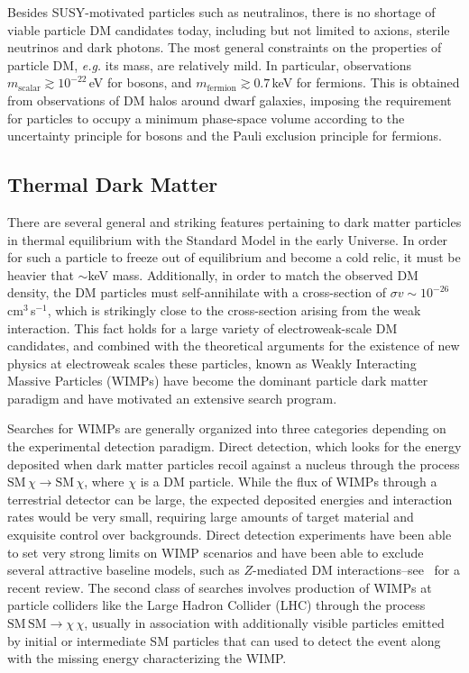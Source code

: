 Besides SUSY-motivated particles such as neutralinos, there is no shortage of viable particle DM candidates today, including but not limited to axions, sterile neutrinos and dark photons. The most general constraints on the properties of particle DM, \emph{e.g.} its mass, are relatively mild. In particular, observations $m_\text{scalar} \gtrsim 10^{-22}$\,eV for bosons, and $m_\text{fermion} \gtrsim 0.7$\,keV for fermions. This is obtained from observations of DM halos around dwarf galaxies, imposing the requirement for particles to occupy a minimum phase-space volume according to the uncertainty principle for bosons and the Pauli exclusion principle for fermions.

\subsection{Thermal Dark Matter}

There are several general and striking features pertaining to dark matter particles in thermal equilibrium with the Standard Model in the early Universe. In order for such a particle to freeze out of equilibrium and become a cold relic, it must be heavier that $\sim$keV mass. Additionally, in order to match the observed DM density, the DM particles must self-annihilate with a cross-section of $\sigma v\sim 10^{-26}$\,cm$^3$\,s$^{-1}$, which is strikingly close to the cross-section arising from the weak interaction. This fact holds for a large variety of electroweak-scale DM candidates, and combined with the theoretical arguments for the existence of new physics at electroweak scales these particles, known as Weakly Interacting Massive Particles (WIMPs) have become the dominant particle dark matter paradigm and have motivated an extensive search program.

Searches for WIMPs are generally organized into three categories depending on the experimental detection paradigm. Direct detection, which looks for the energy deposited when dark matter particles recoil against a nucleus through the process $\text{SM}\,\chi\rightarrow\text{SM}\,\chi$, where $\chi$ is a DM particle. While the flux of WIMPs through a terrestrial detector can be large, the expected deposited energies and interaction rates would be very small, requiring large amounts of target material and exquisite control over backgrounds. Direct detection experiments have been able to set very strong limits on WIMP scenarios and have been able to exclude several attractive baseline models, such as $Z$-mediated DM interactions--see~\cite{} for a recent review. The second class of searches involves production of WIMPs at particle colliders like the Large Hadron Collider (LHC) through the process $\mathrm{SM}\,\mathrm{SM}\rightarrow\chi\,\chi$, usually in association with additionally visible particles emitted by initial or intermediate SM particles that can used to detect the event along with the missing energy characterizing the WIMP. 

